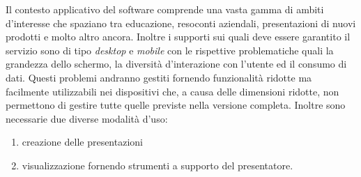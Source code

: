 Il contesto applicativo del software comprende una vasta gamma di ambiti d'interesse che spaziano tra educazione, resoconti aziendali, presentazioni di nuovi prodotti e molto altro ancora.
Inoltre i supporti sui quali deve essere garantito il servizio sono di tipo \textit{desktop} e \textit{mobile} con le rispettive problematiche quali la grandezza dello schermo, la diversità d’interazione con l’utente ed il consumo di dati. Questi problemi andranno gestiti fornendo funzionalità ridotte ma facilmente utilizzabili nei dispositivi che, a causa delle dimensioni ridotte, non permettono di gestire tutte quelle previste nella versione completa.
Inoltre sono necessarie due diverse modalità d’uso:
\begin{enumerate}
  \item creazione delle presentazioni
  \item visualizzazione fornendo strumenti a supporto del presentatore.
\end{enumerate}
